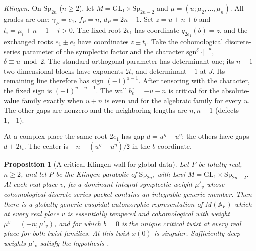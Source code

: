 \documentclass[12pt]{amsart}
\numberwithin{equation}{section}
\theoremstyle{plain}
\newtheorem{proposition}[theorem]{Proposition}
\theoremstyle{definition}
\theoremstyle{remark}
\renewcommand{\bar}{\overline}
\newcommand{\A}{\mathbb A}
\newcommand{\GL}{\mathrm{GL}}
\newcommand{\Sp}{\mathrm{Sp}}
\newcommand{\sgn}{\mathrm{sgn}}
\begin{document}
\emph{Klingen.} On $\Sp_{2n}$ ($n\ge2$), let $M=\GL_1\times\Sp_{2n-2}$ and $\mu=(u;\mu_2,\ldots,\mu_n)$. All grades are one; $\gamma_P=e_1$, $f_P=n$, $d_P=2n-1$. Set $z=u+n+b$ and $t_i=\mu_i+n+1-i>0$. The fixed root $2e_1$ has coordinate $q_{2e_1}(b)=z$, and the exchanged roots $e_1\pm e_i$ have coordinates $z\pm t_i$. Take the cohomological discrete-series parameter of the symplectic factor and the character $\sgn^\delta|\cdot|^{-u}$, $\delta\equiv u\bmod2$. The standard orthogonal parameter has determinant one; its $n-1$ two-dimensional blocks have exponents $2t_i$ and determinant $-1$ at $J$. Its remaining line therefore has sign $(-1)^{n-1}$. After tensoring with the character, the fixed sign is $(-1)^{u+n-1}$. The wall $b_v^\circ=-u-n$ is critical for the absolute-value family exactly when $u+n$ is even and for the algebraic family for every $u$. The other gaps are nonzero and the neighboring lengths are $n,n-1$ (defects $1,-1$).

At a complex place the same root $2e_1$ has gap $d=u^\eta-u^{\bar\eta}$; the others have gaps $d\pm2t_i$. The center is $-n-(u^\eta+u^{\bar\eta})/2$ in the $b$ coordinate. 

\begin{proposition}[A critical Klingen wall for global data]\label{prop:klingen-wall}
Let $F$ be totally real, $n\ge2$, and let $P$ be the Klingen parabolic of $\Sp_{2n}$, with Levi $M=\GL_1\times\Sp_{2n-2}$. At each real place $v$, fix a dominant integral symplectic weight $\mu'_v$ whose cohomological discrete-series packet contains an integrable generic member. Then there is a globally generic cuspidal automorphic representation of $M(\A_F)$ which at every real place $v$ is essentially tempered and cohomological with weight $\mu^v=(-n;\mu'_v)$, and for which $b=0$ is the unique critical twist at every real place for both twist families. At this twist $x(0)$ is singular. Sufficiently deep weights $\mu'_v$ satisfy the hypothesis \cite{Muic2016}. \end{proposition}
\end{document}
